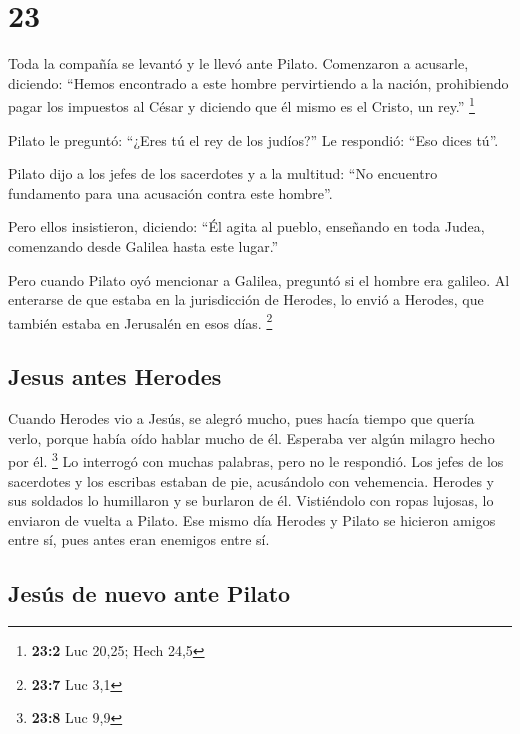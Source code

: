 \hypertarget{section-22}{%
\section{23}\label{section-22}}

 Toda la compañía se levantó y le llevó ante Pilato.
 Comenzaron a acusarle, diciendo: ``Hemos encontrado a
este hombre pervirtiendo a la nación, prohibiendo pagar los impuestos al
César y diciendo que él mismo es el Cristo, un rey.'' \footnote{\textbf{23:2}
  Luc 20,25; Hech 24,5}

 Pilato le preguntó: ``¿Eres tú el rey de los judíos?'' Le
respondió: ``Eso dices tú''.

 Pilato dijo a los jefes de los sacerdotes y a la
multitud: ``No encuentro fundamento para una acusación contra este
hombre''.

 Pero ellos insistieron, diciendo: ``Él agita al pueblo,
enseñando en toda Judea, comenzando desde Galilea hasta este lugar.''

 Pero cuando Pilato oyó mencionar a Galilea, preguntó si
el hombre era galileo.  Al enterarse de que estaba en la
jurisdicción de Herodes, lo envió a Herodes, que también estaba en
Jerusalén en esos días. \footnote{\textbf{23:7} Luc 3,1}

\hypertarget{jesus-antes-herodes}{%
\subsection{Jesus antes Herodes}\label{jesus-antes-herodes}}

 Cuando Herodes vio a Jesús, se alegró mucho, pues hacía
tiempo que quería verlo, porque había oído hablar mucho de él. Esperaba
ver algún milagro hecho por él. \footnote{\textbf{23:8} Luc 9,9}
 Lo interrogó con muchas palabras, pero no le respondió.
 Los jefes de los sacerdotes y los escribas estaban de
pie, acusándolo con vehemencia.  Herodes y sus soldados
lo humillaron y se burlaron de él. Vistiéndolo con ropas lujosas, lo
enviaron de vuelta a Pilato.  Ese mismo día Herodes y
Pilato se hicieron amigos entre sí, pues antes eran enemigos entre sí.

\hypertarget{jesuxfas-de-nuevo-ante-pilato}{%
\subsection{Jesús de nuevo ante
Pilato}\label{jesuxfas-de-nuevo-ante-pilato}}

